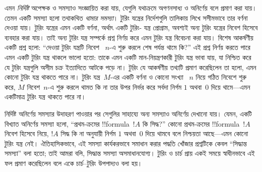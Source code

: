 \documentclass[../../../include/open-logic-section]{subfiles}
\begin{document}
এমন \emph{নির্দিষ্ট} অপেক্ষক ও সমস্যাও সংজ্ঞায়িত করা যায়, যেগুলি যথাক্রমে
অগণনসাধ্য ও অনির্ণেয় বলে প্রমাণ করা যায়। তেমন একটি সমস্যা হলো তথাকথিত
\emph{থামার সমস্যা}। টুরিং যন্ত্রের নির্দেশগুলি তালিকায় লিখে সসীমভাবে তার
বর্ণনা দেওয়া যায়। টুরিং যন্ত্রের এমন একটি বর্ণনা, অর্থাৎ একটি টুরিং-
যন্ত্র প্রোগ্রাম, অবশ্যই অন্য টুরিং যন্ত্রের নিবেশ হিসেবে ব্যবহার করা যায়।
তাই অন্য টুরিং যন্ত্র সম্পর্কে প্রশ্ন নির্ণয় করে এমন টুরিং যন্ত্র বিবেচনা
করা যায়। বিশেষ আকর্ষণীয় একটি প্রশ্ন হলো: “দেওয়া টুরিং যন্ত্রটি নিবেশ
~$n$-এ শুরু করলে শেষ পর্যন্ত থামে কি?” এই প্রশ্ন নির্ণয় করতে পারে এমন
একটি টুরিং যন্ত্র থাকলে ভালো হতো: তাকে এমন একটি মান-নিয়ন্ত্রণকারী টুরিং
যন্ত্র ভাবা যায়, যা নিশ্চিত করে যে টুরিং যন্ত্রগুলি অসীম চক্র ইত্যাদিতে
আটকে পড়ে না। টুরিং যে আকর্ষণীয় তথ্যটি প্রমাণ করেছিলেন তা হলো, এমন কোনো
টুরিং যন্ত্র থাকতে পারে না। টুরিং যন্ত্র~$M$-এর একটি বর্ণনা ও কোনো সংখ্যা
~$n$ নিয়ে গঠিত নিবেশে শুরু করে, $M$ নিবেশ~$n$-এ শুরু করলে থামত কি না তার
উপর নির্ভর করে সর্বদা নির্গম $1$ অথবা~$0$ দিয়ে থামে—এমন একটিমাত্র টুরিং
যন্ত্র থাকতে পারে না।

নির্দিষ্ট অনির্ণেয় সমস্যার উদাহরণ পাওয়ার পর সেগুলির সাহায্যে অন্য
সমস্যাও অনির্ণেয় দেখানো যায়। যেমন, একটি বিখ্যাত অনির্ণেয় সমস্যা হলো,
“প্রথম-ক্রমের !!{formula}~$!A$ কি সিদ্ধ?” কোনো প্রথম-ক্রমের
!!{formula}~$!A$ নিবেশ হিসেবে নিয়ে, $!A$ সিদ্ধ কি না অনুযায়ী নির্গম
$1$ অথবা~$0$ দিয়ে থামবে বলে নিশ্চয়তা আছে—এমন কোনো টুরিং যন্ত্র নেই।
ঐতিহাসিকভাবে, এই সমস্যা কার্যকরভাবে সমাধান করার পদ্ধতি খোঁজার প্রশ্নটিকে
কেবল “সিদ্ধান্ত সমস্যা” বলা হতো; তাই আমরা বলি, সিদ্ধান্ত সমস্যা
অসমাধানযোগ্য। টুরিং ও চার্চ প্রায় একই সময়ে স্বাধীনভাবে এই ফল প্রমাণ
করেছিলেন বলে একে চার্চ--টুরিং উপপাদ্যও বলা হয়।
\end{document}
